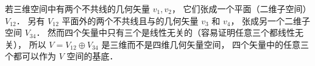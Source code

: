 \begin{example}{}\label{DirSum_ex2}
若三维空间中有两个不共线的几何矢量 ${v_1}, {v_2}$， 它们张成一个平面（二维子空间） $V_{12}$． 另有 $V_{12}$ 平面外的两个不共线且与的几何矢量 ${v_3}$ 和 ${v_4}$， 张成另一个二维子空间 $V_{34}$． 然而四个矢量中只有三个是线性无关的（容易证明任意三个都线性无关）， 所以 $V = V_{12} \oplus V_{34}$ 是三维而不是四维几何矢量空间， 四个矢量中的任意三个都可以作为 $V$ 空间的基底．
\end{example}
